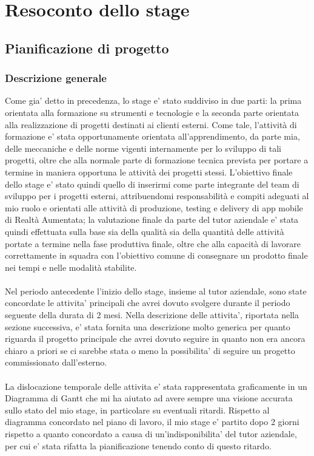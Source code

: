 \section{Resoconto dello stage}
\subsection{Pianificazione di progetto}
\subsubsection{Descrizione generale}
Come gia' detto in precedenza, lo stage e' stato suddiviso in due parti: la prima orientata alla formazione su strumenti e tecnologie e la seconda parte orientata alla realizzazione di progetti destinati ai clienti esterni. Come tale, l’attività di formazione e' stata opportunamente orientata all’apprendimento, da parte mia, delle meccaniche e delle norme vigenti internamente per lo sviluppo di tali progetti, oltre che alla normale parte di formazione tecnica prevista per portare a termine in maniera opportuna le attività dei progetti stessi.
L’obiettivo finale dello stage e' stato quindi quello di inserirmi come parte integrante del team di sviluppo per i progetti esterni, attribuendomi responsabilità e compiti adeguati al mio ruolo e orientati alle attività di produzione, testing e delivery di app mobile di Realtà Aumentata; la valutazione finale da parte del tutor aziendale e' stata quindi effettuata sulla base sia della qualità sia della quantità delle attività portate a termine nella fase produttiva finale, oltre che alla capacità di lavorare correttamente in squadra con l’obiettivo comune di consegnare un prodotto finale nei tempi e nelle modalità stabilite.
\\\\
Nel periodo antecedente l'inizio dello stage, insieme al tutor aziendale, sono state concordate le attivita' principali che avrei dovuto svolgere durante il periodo seguente della durata di 2 mesi. Nella descrizione delle attivita', riportata nella sezione successiva, e' stata fornita una descrizione molto generica per quanto riguarda il progetto principale che avrei dovuto seguire in quanto non era ancora chiaro a priori se ci sarebbe stata o meno la possibilita' di seguire un progetto commissionato dall'esterno.
\\\\
La dislocazione temporale delle attivita e' stata rappresentata graficamente in un Diagramma di Gantt che mi ha aiutato ad avere sempre una visione accurata sullo stato del mio stage, in particolare su eventuali ritardi. Rispetto al diagramma concordato nel piano di lavoro, il mio stage e' partito dopo 2 giorni rispetto a quanto concordato a causa di un'indisponibilita' del tutor aziendale, per cui e' stata rifatta la pianificazione tenendo conto di questo ritardo.

